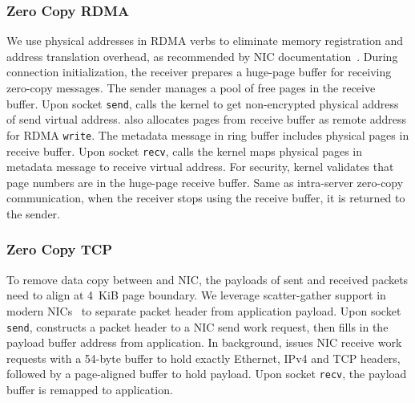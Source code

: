 \subsubsection{Zero Copy RDMA}
\label{subsec:zero-copy-rdma}

We use physical addresses in RDMA verbs to eliminate memory registration and address translation overhead, as recommended by NIC documentation~\cite{mellanox}. During connection initialization, the receiver prepares a huge-page buffer for receiving zero-copy messages. The sender manages a pool of free pages in the receive buffer. Upon socket \texttt{send}, \libipc calls the kernel to get non-encrypted physical address of send virtual address. \libipc also allocates pages from receive buffer as remote address for RDMA \texttt{write}. The metadata message in ring buffer includes physical pages in receive buffer. Upon socket \texttt{recv}, \libipc calls the kernel maps physical pages in metadata message to receive virtual address. For security, kernel validates that page numbers are in the huge-page receive buffer. Same as intra-server zero-copy communication, when the receiver stops using the receive buffer, it is returned to the sender.

\subsubsection{Zero Copy TCP}
\label{subsec:zero-copy-tcp}

To remove data copy between \libipc{} and NIC, the payloads of sent and received packets need to align at 4~KiB page boundary. We leverage scatter-gather support in modern NICs~\cite{mellanox} to separate packet header from application payload.
Upon socket \texttt{send}, \libipc{} constructs a packet header to a NIC send work request, then fills in the payload buffer address from application. In background, \libipc{} issues NIC receive work requests with a 54-byte buffer to hold exactly Ethernet, IPv4 and TCP headers, followed by a page-aligned buffer to hold payload.
Upon socket \texttt{recv}, the payload buffer is remapped to application.



